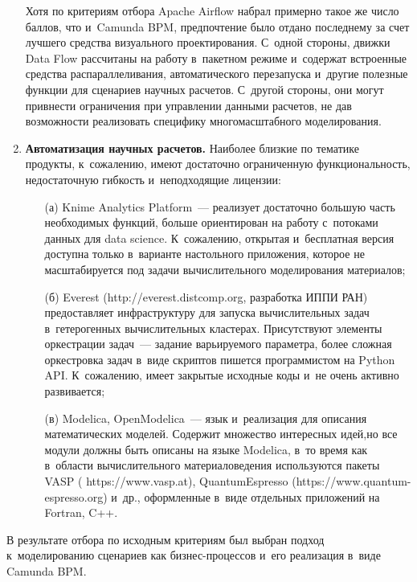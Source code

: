 \begin{multicols}{2}
\begin{enumerate}[1.]
        Хотя по критериям отбора Apache Airflow набрал примерно такое же 
число баллов, что и~Camunda BPM, предпочтение было отдано последнему за счет 
лучшего средства визуального проектирования. С~одной стороны, движки Data 
Flow рассчитаны на работу в~пакетном режиме и~содержат встроенные средства 
распараллеливания, автоматического перезапуска и~другие полезные функции для 
сценариев научных расчетов. С~другой стороны, они могут привнести 
ограничения при управ\-ле\-нии данными расчетов, не дав возможности реализовать 
специфику многомасштабного моделирования.
\item \textbf{Автоматизация научных расчетов.} Наиболее близкие по тематике 
продукты, к~сожалению, имеют достаточно ограниченную функ\-ци\-о\-наль\-ность, 
недостаточную гиб\-кость и~неподходящие лицензии:
     \begin{itemize}
\item[(а)] Knime Analytics Platform~--- реализует достаточно 
большую часть необходимых функций, больше 
ориентирован на работу с~потоками данных для data science. К~\mbox{сожалению}, 
открытая и~бесплатная версия доступна только в~варианте настольного 
приложения, которое не масштабируется под задачи вы\-чис\-ли\-тель\-но\-го 
моделирования материалов;
\item[(б)] Everest ({\sf http://everest.distcomp.org}, разработка ИППИ РАН) 
предоставляет инфраструктуру для запуска вы\-чис\-ли\-тель\-ных задач 
в~гетерогенных вы\-чис\-ли\-тель\-ных \mbox{клас\-те\-рах}. Присутствуют элементы 
оркестрации задач~--- задание варьи\-ру\-емо\-го па\-ра\-мет\-ра, более слож\-ная 
ор\-кест\-ров\-ка задач в~виде скрип\-тов пишется программистом на Python API. 
К~сожалению, имеет закрытые исходные коды и~не очень активно 
развивается;
\item[(в)] Modelica, OpenModelica~--- язык и~реализация для описания 
математических моделей. Содержит множество интересных идей,\linebreak но все 
модули долж\-ны быть описаны на языке Modelica, в~то время как в~об\-ласти\linebreak 
вычислительного материаловедения используются пакеты VASP ({\sf 
https://www.vasp.\linebreak at}), QuantumEspresso  
({\sf https://www.quantum-espresso.org}) и~др., оформленные в~виде 
отдельных приложений на Fortran, C++.
\end{itemize}
\end{enumerate}

        В результате отбора по исходным критериям был выбран подход 
к~моделированию сценариев как биз\-нес-про\-цес\-сов и~его реализация в~виде 
Camunda BPM.
        

\end{multicols}
